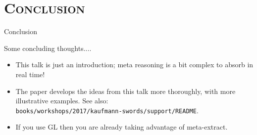 \section{\scshape Conclusion}
\begin{frame}[fragile] {Conclusion}

Some concluding thoughts....

\begin{itemize}

\item This talk is just an introduction; meta reasoning is a bit
  complex to absorb in real time!

\item The paper develops the ideas from this talk more thoroughly,
  with more illustrative examples.  See also: \\
  {\tt books/workshops/2017/kaufmann-swords/support/README}.

\item If you use GL then you are already taking advantage of
  meta-extract.

\end{itemize}

\end{frame}

